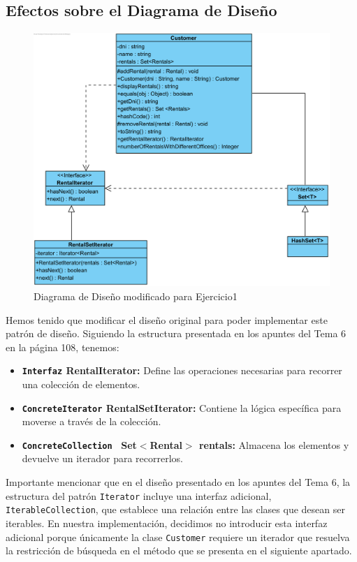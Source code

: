 \subsection{Efectos sobre el Diagrama de Diseño}
\begin{figure}[H]
    \centering
     \includegraphics[width=0.70\linewidth]{assets/diagramas/UML_Apartado1.png}
     \caption{Diagrama de Diseño modificado para Ejercicio1}
\end{figure}
\vspace{0.50cm}
Hemos tenido que modificar el diseño original para poder implementar este patrón de diseño. Siguiendo la estructura presentada en los apuntes del Tema 6 en la página 108, tenemos:
\begin{itemize}
    \item \textbf{\texttt{Interfaz} RentalIterator:} Define las operaciones necesarias para recorrer una colección de elementos.
    \item \textbf{\texttt{ConcreteIterator} RentalSetIterator:} Contiene la lógica específica para moverse a través de la colección.
    \item \textbf{\texttt{ConcreteCollection } Set$<$Rental$>$ rentals:} Almacena los elementos y devuelve un iterador para recorrerlos.
\end{itemize}
\vspace{0.15cm}
Importante mencionar que en el diseño presentado en los apuntes del Tema 6, la estructura del patrón \texttt{Iterator} incluye una interfaz adicional, 
\texttt{IterableCollection}, que establece una relación entre las clases que desean ser iterables. En nuestra implementación, decidimos no introducir 
esta interfaz adicional porque únicamente la clase \texttt{Customer} requiere un iterador que resuelva la restricción de búsqueda en el método que se presenta 
en el siguiente apartado.

